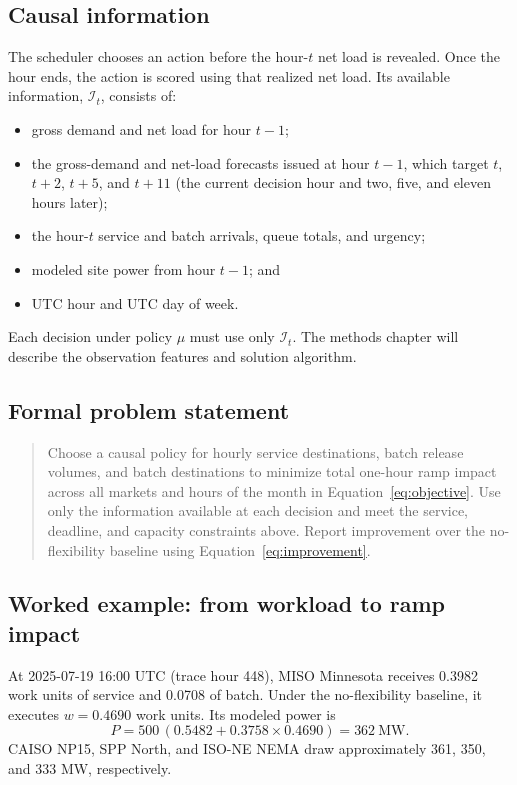 \documentclass[conference]{IEEEtran}
\begin{document}
\subsection{Causal information}
\label{subsec:problem-causality}

The scheduler chooses an action before the hour-\(t\) net load is revealed.
Once the hour ends, the action is scored using that realized net load.
Its available information, \(\mathcal I_t\), consists of:
\begin{itemize}
  \item gross demand and net load for hour \(t-1\);
  \item the gross-demand and net-load forecasts issued at hour \(t-1\),
        which target \(t\), \(t+2\), \(t+5\), and \(t+11\) (the current
        decision hour and two, five, and eleven hours later);
  \item the hour-\(t\) service and batch arrivals, queue totals, and urgency;
  \item modeled site power from hour \(t-1\); and
  \item UTC hour and UTC day of week.
\end{itemize}

Each decision under policy \(\mu\) must use only \(\mathcal I_t\). The methods
chapter will describe the observation features and solution algorithm.

\subsection{Formal problem statement}
\label{subsec:problem-formal-statement}

\begin{quote}
Choose a causal policy for hourly service destinations, batch release
volumes, and batch destinations to minimize total one-hour ramp impact
across all markets and hours of the month in Equation~\eqref{eq:objective}. Use only the
information available at each decision and meet the service, deadline, and
capacity constraints above. Report improvement over the no-flexibility
baseline using Equation~\eqref{eq:improvement}.
\end{quote}

\subsection{Worked example: from workload to ramp impact}
\label{subsec:problem-worked-objective}

At 2025-07-19 16:00 UTC (trace hour 448), MISO Minnesota receives
0.3982 work units of service and 0.0708 of batch. Under the no-flexibility
baseline, it executes \(w=0.4690\) work units. Its modeled power is
\begin{equation*}
  P = 500\,(0.5482 + 0.3758 \times 0.4690) = 362 \ \mathrm{MW}.
\end{equation*}
CAISO NP15, SPP North, and ISO-NE NEMA draw approximately 361, 350, and
333 MW, respectively.
\end{document}
